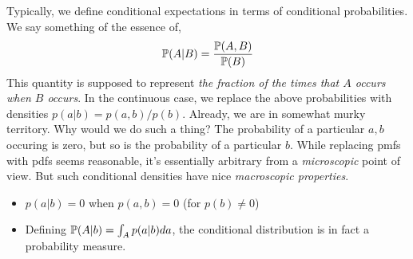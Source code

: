 Typically, we define conditional expectations in terms of conditional probabilities. 
We say something of the essence of, 
\[ \mathbb P(A|B) = \frac{\mathbb P(A,B)}{\mathbb P(B)} \]
This quantity is supposed to represent \emph{the fraction of the times that $A$ occurs when $B$ occurs}. 
In the continuous case, we replace the above probabilities with densities $p(a|b) = p(a,b)/p(b)$. Already, we are in somewhat murky 
territory. Why would we do such a thing? The probability of a particular $a,b$ occuring is zero, but so is the probability of 
a particular $b$. While replacing pmfs with pdfs seems reasonable, it's essentially arbitrary
from a \emph{microscopic} point of view. But such conditional densities have nice \emph{macroscopic properties}. 
\begin{itemize}
    \item $p(a|b) = 0$ when $p(a,b) = 0$ (for $p(b) \neq 0$)
    \item Defining $\mathbb P(A|b) = \int_A p(a|b)da$, the conditional distribution is 
        in fact a probability measure.
\end{itemize}
